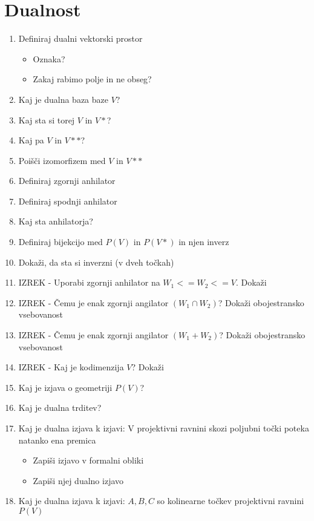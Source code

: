 \documentclass{article}
\begin{document}
    \section{Dualnost}
    \begin{enumerate}
        \item Definiraj dualni vektorski prostor
        \begin{itemize}
            \item Oznaka?
            \item Zakaj rabimo polje in ne obseg?
        \end{itemize}
        \item Kaj je dualna baza baze $V$?
        \item Kaj sta si torej $V$ in $V*$?
        \item Kaj pa $V$ in $V**$?
        \item Poišči izomorfizem med $V$ in $V**$
        \item Definiraj zgornji anhilator
        \item Definiraj spodnji anhilator
        \item Kaj sta anhilatorja?
        \item Definiraj bijekcijo med $P(V)$ in $P(V*)$ in njen inverz
        \item Dokaži, da sta si inverzni (v dveh točkah)
        \item IZREK - Uporabi zgornji anhilator na $W_1 <= W_2 <= V$. Dokaži
        \item IZREK - Čemu je enak zgornji angilator $(W_1  \cap W_2)$? Dokaži obojestransko vsebovanost
        \item IZREK - Čemu je enak zgornji angilator $(W_1  + W_2)$? Dokaži obojestransko vsebovanost
        \item IZREK - Kaj je kodimenzija $V$? Dokaži
        \item Kaj je izjava o geometriji $P(V)$?
        \item Kaj je dualna trditev?
        \item Kaj je dualna izjava k izjavi: V projektivni ravnini skozi poljubni točki poteka natanko ena premica
        \begin{itemize}
            \item Zapiši izjavo v formalni obliki
            \item Zapiši njej dualno izjavo
        \end{itemize}
        \item Kaj je dualna izjava k izjavi: $A, B, C$ so kolinearne točkev projektivni ravnini $P(V)$

\end{enumerate}
\end{document}
